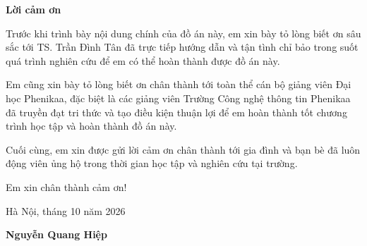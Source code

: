 
\begin{center}
    \Large{\textbf{Lời cảm ơn}}
\end{center}
\vspace{1cm}

Trước khi trình bày nội dung chính của đồ án này, em xin bày tỏ lòng biết ơn sâu sắc tới TS. Trần Đình Tân đã trực tiếp hướng dẫn và tận tình chỉ bảo trong suốt quá trình nghiên cứu để em có thể hoàn thành được đồ án này.
\medskip

Em cũng xin bày tỏ lòng biết ơn chân thành tới toàn thể cán bộ giảng viên Đại học Phenikaa, đặc biệt là các giảng viên Trường Công nghệ thông tin Phenikaa đã truyền đạt tri thức và tạo điều kiện thuận lợi để em hoàn thành tốt chương trình học tập và hoàn thành đồ án này.
\medskip

Cuối cùng, em xin được gửi lời cảm ơn chân thành tới gia đình và bạn bè đã luôn động viên ủng hộ trong thời gian học tập và nghiên cứu tại trường.
\medskip

Em xin chân thành cảm ơn!
\vspace{1cm}

\hskip9.5cm Hà Nội, tháng 10 năm 2026

\vspace{2cm}

\hskip10.5cm{\bf Nguyễn Quang Hiệp}
\pagebreak